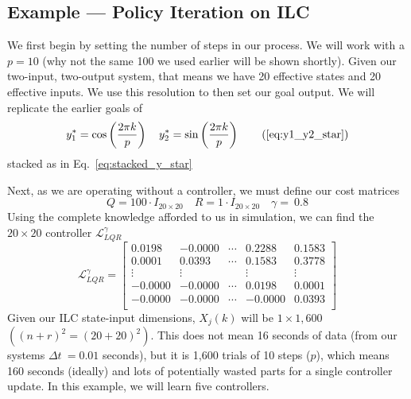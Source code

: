 \FloatBarrier\subsection{Example --- Policy Iteration on ILC}
We first begin by setting the number of steps in our process. We will work with a $p=10$ (why not the same 100 we used earlier will be shown shortly). Given our two-input, two-output system, that means we have 20 effective states and 20 effective inputs. We use this resolution to then set our goal output. We will replicate the earlier goals of
\begin{equation}
    y_1^\ast=\cos\left(\frac{2\pi k}{p}\right)
    \quad
    y_2^\ast=\sin\left(\frac{2\pi k}{p}\right)
    \tag{\ref{eq:y1_y2_star}}
\end{equation}
stacked as in Eq.~\ref{eq:stacked_y_star}

Next, as we are operating without a controller, we must define our cost matrices
\begin{equation}
    Q=100\cdot I_{20\times 20}
    \quad
    R=1\cdot I_{20\times 20}
    \quad
    \gamma=\ 0.8
    \label{eq:rl_ilc_params}
\end{equation}
Using the complete knowledge afforded to us in simulation, we can find the $20 \times20$ controller $\mathcal{L}_{LQR}^\gamma$
\begin{equation}
    \mathcal{L}_{LQR}^\gamma=\left[\begin{matrix}0.0198&-0.0000&\cdots&0.2288&0.1583\\0.0001&0.0393&\cdots&0.1583&0.3778\\\vdots&\vdots&&\vdots&\vdots\\-0.0000&-0.0000&\cdots&0.0198&0.0001\\-0.0000&-0.0000&\cdots&-0.0000&0.0393\\\end{matrix}\right]
    \label{eq:ilc_lqr_controller}
\end{equation}
Given our ILC state-input dimensions, $X_j\left(k\right)$ will be $1 \times1,600$ $({\left(n+r\right)}^2={\left(20+20\right)}^2)$. This does not mean 16 seconds of data (from our systems $\Delta t\ = 0.01$ seconds), but it is 1,600 trials of 10 steps ($p$), which means 160 seconds (ideally) and lots of potentially wasted parts for a single controller update. In this example, we will learn five controllers.

